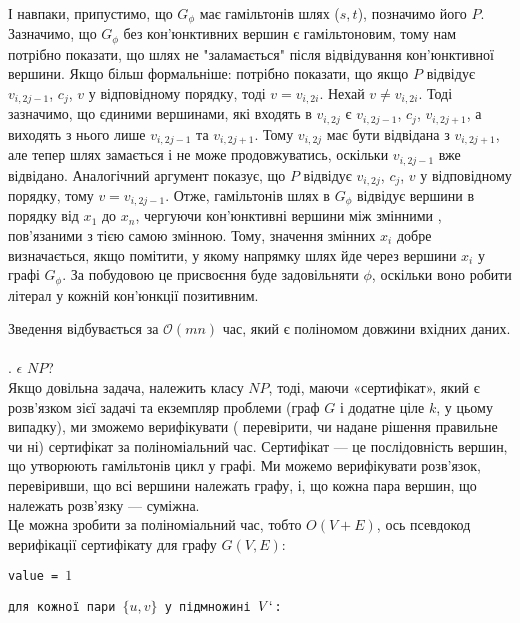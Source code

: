 \documentclass[14pt]{article}
\begin{document}
\begin{spacing}{1.175}
    \\
    \quad І навпаки, припустимо, що \(G_{\phi}\) має гамільтонів шлях (\(s, t\)), позначимо його \(P\). Зазначимо, що \(G_{\phi}\) без кон'юнктивних вершин є гамільтоновим, тому нам потрібно показати, що шлях не "заламається" після відвідування кон'юнктивної вершини. Якщо більш формальніше: потрібно показати, що якщо \(P\) відвідує \(v_{i, 2j-1}\), \(c_j\), \(v\) у відповідному порядку, тоді \(v = v_{i,2i}\). Нехай \(v \neq v_{i,2i}\). Тоді зазначимо, що єдиними вершинами, які входять в \(v_{i,2j}\) є \(v_{i,2j-1}\), \(c_j\), \(v_{i,2j+1}\), а виходять з нього лише \(v_{i,2j-1}\) та \(v_{i,2j+1}\). Тому \(v_{i,2j}\) має бути відвідана з \(v_{i,2j+1}\), але тепер шлях замається і не може продовжуватись, оскільки \(v_{i,2j-1}\) вже відвідано. Аналогічний аргумент показує, що \(P\) відвідує \(v_{i, 2j}\), \(c_j\), \(v\) у відповідному порядку, тому \(v = v_{i,2j-1}\). Отже, гамільтонів шлях в \(G_{\phi}\) відвідує вершини в порядку від \(x_1\) до \(x_n\), чергуючи кон'юнктивні вершини між змінними , пов'язаними з тією самою змінною. Тому, значення змінних \(x_i\) добре визначається, якщо помітити, у якому напрямку шлях йде через вершини \(x_i\) у графі \(G_{\phi}\). За побудовою це присвоєння буде задовільняти \(\phi\), оскільки воно робити літерал у кожній кон'юнкції позитивним.
    
    \quad Зведення відбувається за \(\mathcal{O}(mn)\) час, який є поліномом довжини вхідних даних.
    \\


    \\
    . \hamcycle \(\epsilon\) \(NP\)?\\
        Якщо довільна задача, належить класу \(NP\), тоді, маючи «сертифікат», який є розв'язком зієї задачі та екземпляр проблеми (граф \(G\) і додатне ціле \(k\), у цьому випадку), ми зможемо верифікувати ( перевірити, чи надане рішення правильне чи ні) сертифікат за поліноміальний час. Сертифікат — це послідовність вершин, що утворюють гамільтонів цикл у графі. Ми можемо верифікувати розв'язок, перевіривши, що всі вершини належать графу, і, що кожна пара вершин, що належать розв’язку — суміжна.\\ Це можна зробити за поліноміальний час, тобто \(O(V + E)\), ось
        псевдокод верифікації сертифікату для графу \(G(V, E)\):
    
        \quad \texttt{value = \(1\)}
        
        \quad \texttt{для кожної пари \( \{u, v\}\) у підмножині \(V`\):}
        

\end{spacing}
\end{document}
